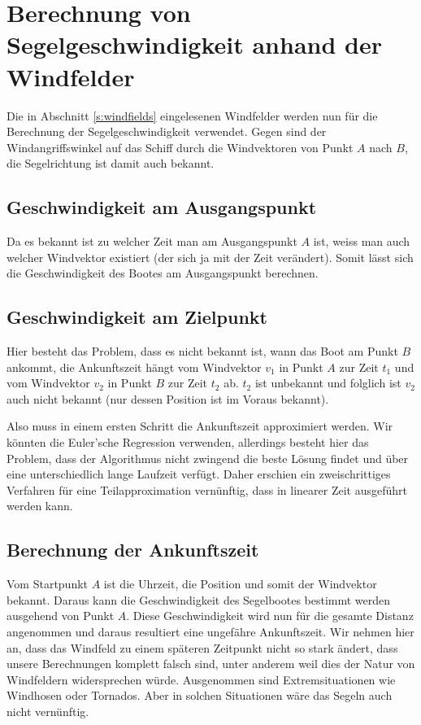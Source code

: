 
\section{Berechnung von Segelgeschwindigkeit anhand der Windfelder}
Die in Abschnitt \ref{s:windfields} eingelesenen Windfelder werden nun
für die Berechnung der Segelgeschwindigkeit verwendet. Gegen sind der
Windangriffswinkel auf das Schiff durch die Windvektoren von Punkt $A$
nach $B$, die Segelrichtung ist damit auch bekannt.

 
\subsection{Geschwindigkeit am Ausgangspunkt}
Da es bekannt ist zu welcher Zeit man am Ausgangspunkt $A$ ist, weiss
man auch welcher Windvektor existiert (der sich ja mit der Zeit
verändert). Somit lässt sich die Geschwindigkeit des Bootes am
Ausgangspunkt berechnen.

\subsection{Geschwindigkeit am Zielpunkt}
Hier besteht das Problem, dass es nicht bekannt ist, wann das Boot am
Punkt $B$ ankommt, die Ankunftszeit hängt vom Windvektor $v_{1}$ in
Punkt $A$ zur Zeit $t_{1}$ und vom Windvektor $v_{2}$ in Punkt $B$ zur
Zeit $t_{2}$ ab. $t_{2}$ ist unbekannt und folglich ist $v_{2}$ auch
nicht bekannt (nur dessen Position ist im Voraus bekannt).

Also muss in einem ersten Schritt die Ankunftszeit approximiert werden.
Wir könnten die Euler'sche Regression verwenden, allerdings besteht hier
das Problem, dass der Algorithmus nicht zwingend die beste Lösung findet
und über eine unterschiedlich lange Laufzeit verfügt. Daher erschien ein
zweischrittiges Verfahren für eine Teilapproximation vernünftig, dass in
linearer Zeit ausgeführt werden kann.

\subsection{Berechnung der Ankunftszeit}
Vom Startpunkt $A$ ist die Uhrzeit, die Position und somit der
Windvektor bekannt. Daraus kann die Geschwindigkeit des Segelbootes
bestimmt werden ausgehend von Punkt $A$. Diese Geschwindigkeit wird nun
für die gesamte Distanz angenommen und daraus resultiert eine ungefähre
Ankunftszeit. Wir nehmen hier an, dass das Windfeld zu einem späteren
Zeitpunkt nicht so stark ändert, dass unsere Berechnungen komplett
falsch sind, unter anderem weil dies der Natur von Windfeldern
widersprechen würde. Ausgenommen sind Extremsituationen wie Windhosen
oder Tornados. Aber in solchen Situationen wäre das Segeln auch nicht
vernünftig.

